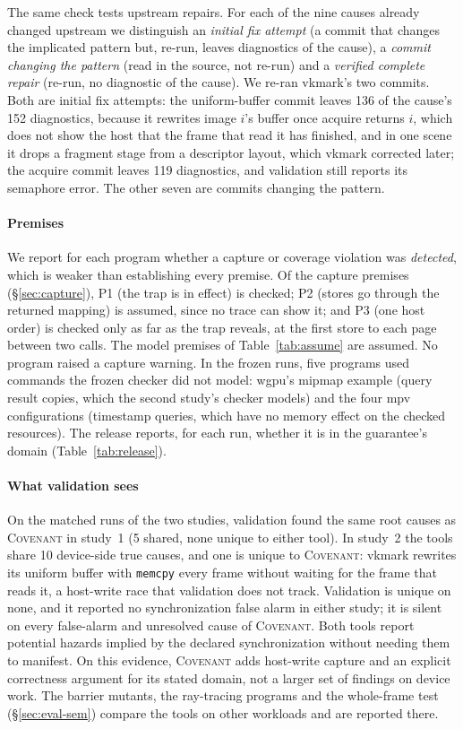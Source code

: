 \documentclass[acmtog,anonymous,review]{acmart}
\newcommand{\sys}{\textsc{Covenant}\xspace}
\newcommand{\code}[1]{\texttt{#1}}
\begin{document}
The same check tests upstream repairs. For each of the nine causes already changed upstream we distinguish an
\emph{initial fix attempt} (a commit that changes the implicated pattern but, re-run, leaves diagnostics of the
cause), a \emph{commit changing the pattern} (read in the source, not re-run) and a \emph{verified complete repair}
(re-run, no diagnostic of the cause). We re-ran vkmark's two commits. Both are initial fix attempts: the
uniform-buffer commit leaves 136 of the cause's 152 diagnostics, because it rewrites image $i$'s
buffer once acquire returns $i$, which does not show the host that the frame that read it has finished, and in one
scene it drops a fragment stage from a descriptor layout, which vkmark corrected later; the acquire commit
leaves 119 diagnostics, and validation still reports its semaphore error. The other seven are
commits changing the pattern.

\paragraph{Premises}
We report for each program whether a capture or coverage violation was \emph{detected}, which is weaker than
establishing every premise. Of the capture premises (\S\ref{sec:capture}), P1 (the trap is in effect) is checked; P2
(stores go through the returned mapping) is assumed, since no trace can show it; and P3 (one host order) is checked
only as far as the trap reveals, at the first store to each page between two calls. The model premises of
Table~\ref{tab:assume} are assumed. No program raised a capture warning. In the frozen runs, five programs used
commands the frozen checker did not model: wgpu's mipmap example (query result copies, which the second study's
checker models) and the four mpv configurations (timestamp queries, which have no memory effect on the checked
resources). The release reports, for each run, whether it is in the guarantee's domain
(Table~\ref{tab:release}).

\paragraph{What validation sees}
On the matched runs of the two studies, validation found the same root causes as \sys in study~1 (5 shared, none
unique to either tool). In study~2 the tools share 10 device-side true causes, and one is unique to \sys: vkmark rewrites its uniform buffer with \code{memcpy} every frame
without waiting for the frame that reads it, a host-write race that validation does not track. Validation is unique
on none, and it reported no synchronization false alarm in either study; it is silent on every false-alarm and
unresolved cause of \sys. Both tools report potential hazards implied by the declared synchronization without
needing them to manifest. On this evidence, \sys adds host-write capture and an explicit correctness argument for
its stated domain, not a larger set of findings on device work. The barrier mutants, the ray-tracing programs and the
whole-frame test (\S\ref{sec:eval-sem}) compare the tools on other workloads and are reported there.
\end{document}
